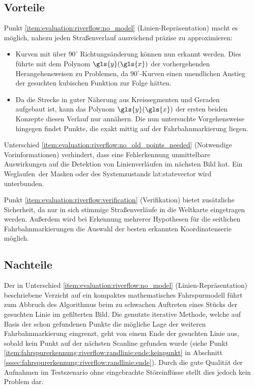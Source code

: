 \subsection{Vorteile}
Punkt \ref{item:evaluation:riverflow:no_model} (Linien-Repräsentation) macht es möglich, nahezu jeden Straßenverlauf ausreichend präzise zu approximieren:
\begin{itemize} 
\item
Kurven mit über \(90^{\circ}\) Richtungsänderung können nun erkannt werden. Dies führte mit dem Polynom \(\gls{y}(\gls{x})\) der vorhergehenden Herangehensweisen zu Problemen, da \(90^{\circ}\)-Kurven einen unendlichen Anstieg der gesuchten kubischen Funktion zur Folge hätten.
\item
Da die Strecke in guter Näherung aus Kreissegmenten und Geraden aufgebaut ist, kann das  Polynom \(\gls{y}(\gls{x})\) der ersten beiden Konzepte diesen Verlauf nur annähern. Die nun untersuchte Vorgehensweise hingegen findet Punkte, die exakt mittig auf der Fahrbahnmarkierung liegen.
\end{itemize}
Unterschied \ref{item:evaluation:riverflow:no_old_points_needed} (Notwendige Vorinformationen) verhindert, dass eine Fehlerkennung unmittelbare Auswirkungen auf die Detektion von Linienverläufen im nächsten Bild hat. Ein \glqq Weglaufen\grqq\ der Masken oder des Systemzustands \gls{lat:statevector} wird unterbunden.

Punkt \ref{item:evaluation:riverflow:verification} (Verifikation) bietet zusätzliche Sicherheit, da nur in sich stimmige Straßenverläufe in die Weltkarte eingetragen werden. Außerdem wird bei Erkennung mehrerer Hypothesen für die seitlichen Fahrbahnmarkierungen die Auswahl der besten erkannten Koordinatenserie möglich.

\subsection{Nachteile}
\label{ssec:evaluation:riverflow:diskussion_prinzip:nachteile}
Der in Unterschied \ref{item:evaluation:riverflow:no_model} (Linien-Repräsentation) beschriebene Verzicht auf ein kompaktes mathematisches Fahrspurmodell führt zum Abbruch des Algorithmus beim zu schwachen Auftreten eines Stücks der gesuchten Linie im gefilterten Bild. Die genutzte iterative Methode, welche auf Basis der schon gefundenen Punkte die mögliche Lage der weiteren Fahrbahnmarkierung eingrenzt, geht von einem Ende der gesuchten Linie aus, sobald kein Punkt auf der nächsten Scanline gefunden wurde (siehe Punkt \ref{item:fahrspurerkennung:riverflow:randlinie:ende:keinpunkt} in Abschnitt \ref{sssec:fahrspurerkennung:riverflow:randlinie:ende}). Durch die gute Qualität der Aufnahmen im Testszenario ohne eingebrachte Störeinflüsse stellt dies jedoch kein  Problem dar.


